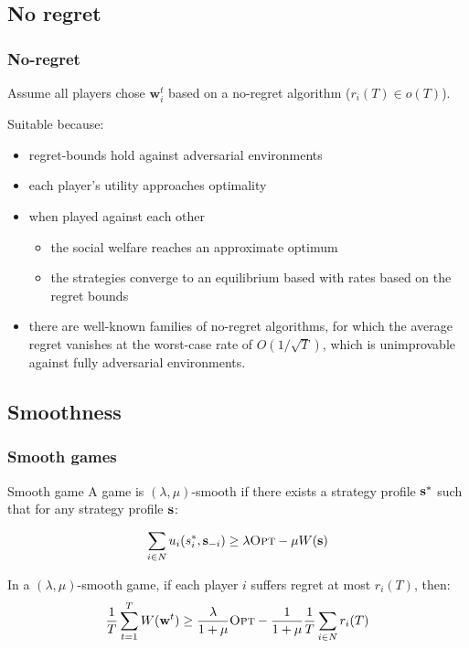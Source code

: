 \documentclass{beamer}
\renewcommand{\vec}[1]{\ensuremath{{\bf #1}}}
\newcommand{\st}{\ensuremath{s}}
\newcommand{\mst}{\ensuremath{w}}
\newcommand{\opt}{\text{\textsc{Opt}} }
\begin{document}
\subsection{No regret}
\begin{frame}
	\frametitle{No-regret}
	Assume all players chose $\mathbf{w}^t_i$ based on a no-regret algorithm ($ r_i(T) \in o(T)$). \pause
	
	Suitable because:
	\begin{itemize}
		\item regret-bounds hold against adversarial environments
		\item each player's utility approaches optimality
		\item when played against each other
		\begin{itemize}
			\item the social welfare reaches an approximate optimum
			\item the strategies converge to an equilibrium based with rates based on the regret bounds
		\end{itemize} 
		\item there are well-known families of no-regret algorithms, for which the average regret vanishes at the worst-case rate of $O(1/\sqrt{T})$, which is unimprovable against fully adversarial environments.
	\end{itemize}
\end{frame}

\subsection{Smoothness}
\begin{frame}
	\frametitle{Smooth games}
	\begin{block}{Smooth game}
		A game is
		$(\lambda,\mu)$-smooth if there exists a strategy profile
		$\vec{\st}^*$ such that for any strategy profile $\vec{\st}$:
		
		\begin{equation*}
		\sum_{i\in N} u_i(\st_i^*,\vec{\st}_{-i}) \geq \lambda \opt - \mu
		W(\vec{\st})
		\end{equation*}
	\end{block}
	\pause
	\begin{block}{}
		In a $(\lambda,\mu)$-smooth game, if each player $i$ suffers regret at
		most $r_i(T)$, then:
		\begin{equation*}
		\frac{1}{T} \sum_{t=1}^{T}
		W(\vec{\mst}^t) \geq \frac{\lambda}{1+\mu} \opt
		- \frac{1}{1+\mu}\frac{1}{T}\sum_{i\in N} r_i(T)
		\end{equation*}
	\end{block}
\end{frame}
\end{document}
